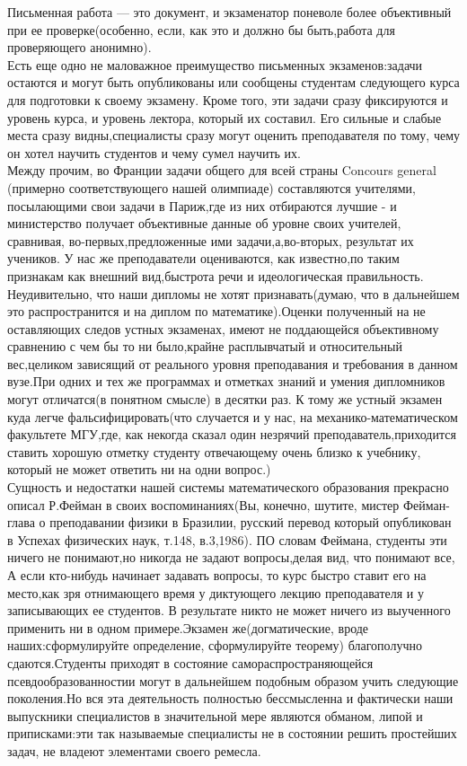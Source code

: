 \documentclass{article}
\begin{document}
{Письменная работа --- это документ, и экзаменатор поневоле более объективный при ее проверке(особенно, если, как это и должно бы быть,работа для проверяющего анонимно).\\
Есть еще одно не маловажное преимущество письменных экзаменов:задачи остаются и могут быть опубликованы или сообщены студентам следующего курса для подготовки к своему экзамену. Кроме того, эти задачи сразу фиксируются и уровень курса, и уровень лектора, который их составил. Его сильные и слабые места сразу видны,специалисты сразу могут оценить преподавателя по тому, чему он хотел научить студентов и чему сумел научить их.\\
Между прочим, во Франции задачи общего для всей страны Concours general
(примерно соответствующего нашей олимпиаде) составляются учителями, посылающими свои задачи в Париж,где из них отбираются лучшие - и министерство получает объективные данные об уровне своих учителей, сравнивая, во-первых,предложенные ими задачи,а,во-вторых, результат их учеников. У нас же преподаватели оцениваются, как известно,по таким признакам как внешний вид,быстрота речи и идеологическая \glqq правильность\grqq.\\
Неудивительно, что наши дипломы не хотят признавать(думаю, что в дальнейшем это распространится и на диплом по математике).Оценки полученный на не оставляющих следов устных экзаменах, имеют не поддающейся объективному сравнению с чем бы то ни было,крайне расплывчатый и относительный вес,целиком зависящий от реального уровня преподавания и требования в данном вузе.При одних и тех же программах и отметках знаний и умения дипломников могут отличатся(в понятном смысле) в десятки раз. К тому же устный экзамен куда легче фальсифицировать(что случается и у нас, на механико-математическом факультете МГУ,где, как некогда сказал один незрячий преподаватель,приходится ставить хорошую отметку студенту \glqq отвечающему очень близко к учебнику\grqq, который не может ответить ни на одни вопрос.)\\
Сущность и недостатки нашей системы математического образования прекрасно описал Р.Фейман в своих воспоминаниях(\glqq Вы, конечно, шутите, мистер Фейман\grqq - глава о преподавании физики в Бразилии, русский перевод который опубликован в Успехах физических наук, т.148, в.3,1986).
ПО словам Феймана, студенты эти ничего не понимают,но никогда не задают вопросы,делая вид, что понимают все, А если кто-нибудь начинает задавать вопросы, то курс быстро ставит его на место,как зря отнимающего время у диктующего лекцию преподавателя и у записывающих ее студентов. В результате никто не может ничего из выученного применить ни в одном примере.Экзамен же(догматические, вроде наших:сформулируйте определение, сформулируйте теорему) благополучно сдаются.Студенты приходят в состояние \glqq самораспространяющейся псевдообразованности\grqq  и могут в дальнейшем подобным образом учить следующие поколения.Но вся эта деятельность полностью бессмысленна и фактически наши выпускники специалистов в значительной мере являются обманом, липой и приписками:эти так называемые специалисты не в состоянии решить простейших задач, не владеют элементами своего ремесла.\\
}
\end{document}
